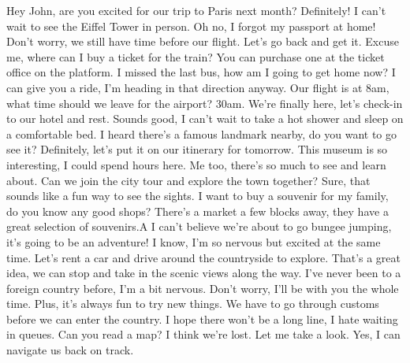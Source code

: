\documentclass[]{article} %
\begin{document}
\begin{minipage}[h]{0.95\textwidth}
		
		\begin{dialogue}
			 Hey John, are you excited for our trip to Paris next month?
			 Definitely! I can't wait to see the Eiffel Tower in person.
			 Oh no, I forgot my passport at home!
			 Don't worry, we still have time before our flight. Let's go back and get it.
			 Excuse me, where can I buy a ticket for the train?
			 You can purchase one at the ticket office on the platform.
			 I missed the last bus, how am I going to get home now?
			 I can give you a ride, I'm heading in that direction anyway.
			 Our flight is at 8am, what time should we leave for the airport?
			 30am.
			 We're finally here, let's check-in to our hotel and rest.
			 Sounds good, I can't wait to take a hot shower and sleep on a comfortable bed.
			 I heard there's a famous landmark nearby, do you want to go see it?
			 Definitely, let's put it on our itinerary for tomorrow.
			 This museum is so interesting, I could spend hours here.
			 Me too, there's so much to see and learn about.
			 Can we join the city tour and explore the town together?
			 Sure, that sounds like a fun way to see the sights.
			 I want to buy a souvenir for my family, do you know any good shops?
			 There's a market a few blocks away, they have a great selection of souvenirs.A I can't believe we're about to go bungee jumping, it's going to be an adventure!
			 I know, I'm so nervous but excited at the same time.
			 Let's rent a car and drive around the countryside to explore.
			 That's a great idea, we can stop and take in the scenic views along the way.
			 I've never been to a foreign country before, I'm a bit nervous.
			 Don't worry, I'll be with you the whole time. Plus, it's always fun to try new things.
			 We have to go through customs before we can enter the country.
			 I hope there won't be a long line, I hate waiting in queues.
			 Can you read a map? I think we're lost.
			 Let me take a look. Yes, I can navigate us back on track.
			
			
			
		\end{dialogue}
		
	\end{minipage}
	
\end{document}
